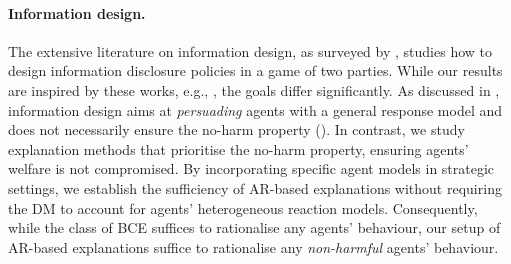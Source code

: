 \paragraph{Information design.} 
The extensive literature on information design, as surveyed by \citet{bergemann2019information}, studies how to design information disclosure policies in a game of two parties. While our results are inspired by these works, e.g., , the goals differ significantly. As discussed in , information design aims at \textit{persuading} agents with a general response model and does not necessarily ensure the no-harm property (). In contrast, we study explanation methods that prioritise the no-harm property, ensuring agents' welfare is not compromised.
By incorporating specific agent models in strategic settings, we establish the sufficiency of AR-based explanations without requiring the DM to account for agents' heterogeneous reaction models.
Consequently, while the class of BCE suffices to rationalise any agents' behaviour, our setup of AR-based explanations suffice to rationalise any \textit{non-harmful} agents' behaviour.





